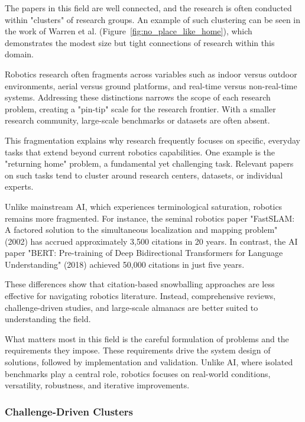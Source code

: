 \documentclass[runningheads]{llncs}
\begin{document}
The papers in this field are well connected, and the research is often conducted within "clusters" of research groups. An example of such clustering can be seen in the work of Warren et al. (Figure~\ref{fig:no_place_like_home}), which demonstrates the modest size but tight connections of research within this domain.

Robotics research often fragments across variables such as indoor versus outdoor environments, aerial versus ground platforms, and real-time versus non-real-time systems. Addressing these distinctions narrows the scope of each research problem, creating a "pin-tip" scale for the research frontier. With a smaller research community, large-scale benchmarks or datasets are often absent.

This fragmentation explains why research frequently focuses on specific, everyday tasks that extend beyond current robotics capabilities. One example is the "returning home" problem, a fundamental yet challenging task. Relevant papers on such tasks tend to cluster around research centers, datasets, or individual experts.

Unlike mainstream AI, which experiences terminological saturation, robotics remains more fragmented. For instance, the seminal robotics paper "FastSLAM: A factored solution to the simultaneous localization and mapping problem" (2002) has accrued approximately 3,500 citations in 20 years. In contrast, the AI paper "BERT: Pre-training of Deep Bidirectional Transformers for Language Understanding" (2018) achieved 50,000 citations in just five years. 

These differences show that citation-based snowballing approaches are less effective for navigating robotics literature. Instead, comprehensive reviews, challenge-driven studies, and large-scale almanacs are better suited to understanding the field.

What matters most in this field is the careful formulation of problems and the requirements they impose. These requirements drive the system design of solutions, followed by implementation and validation. Unlike AI, where isolated benchmarks play a central role, robotics focuses on real-world conditions, versatility, robustness, and iterative improvements.


\subsubsection{Challenge-Driven Clusters}
\end{document}
